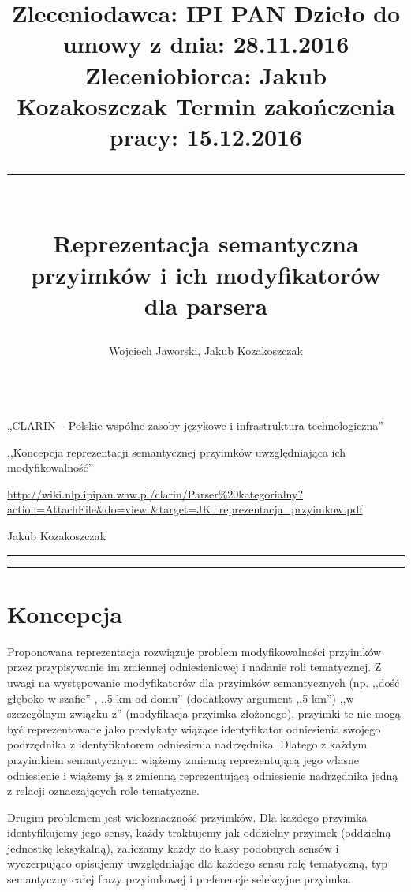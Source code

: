 \documentclass[a4paper, 12pt]{article}
\title{
\normalsize
\setlength{\topsep}{0pt} 
\noindent
Zleceniodawca: IPI PAN \hfill Dzieło do umowy z dnia:  28.11.2016 \\
Zleceniobiorca: Jakub Kozakoszczak \hfill Termin zakończenia pracy: 15.12.2016 \\
\rule{\linewidth}{2pt} \\[6pt] 
\huge Reprezentacja semantyczna \\ przyimków i ich modyfikatorów \\ dla parsera \eniam  \\[-2pt]}
\author{\Large Wojciech Jaworski, Jakub Kozakoszczak\\[6pt]
\hspace{-5pt}\rule{\linewidth}{2pt}  }
\date{}
\theoremstyle{remark}
\begin{document}
\maketitle

\vspace{-26pt}
\begin{description}
	\setlength{\itemsep}{4pt} 
	\setlength{\parskip}{0pt} 
	\item[Zrealizowane w ramach projektu:] „CLARIN -- Polskie wspólne zasoby językowe i infrastruktura technologiczna”
	\item[Tytuł pracy zamówionej:] ,,Koncepcja reprezentacji semantycznej przyimków uwzględniająca ich modyfikowalność''
	\item[Adres dzieła:] \url{http://wiki.nlp.ipipan.waw.pl/clarin/Parser%
	&target=JK_reprezentacja_przyimkow.pdf}
	\item[Opracowanie dokumentu:] Jakub Kozakoszczak
\end{description}

\vspace{6pt}
\hrule
\vspace{-14pt}
\renewcommand\contentsname{\normalsize{}}
\tableofcontents
\vspace{20pt}
\hrule
\newpage

\section{Koncepcja} %

Proponowana reprezentacja rozwiązuje problem modyfikowalności przyimków przez przypisywanie im zmiennej odniesieniowej i nadanie roli tematycznej.
Z uwagi na występowanie modyfikatorów dla przyimków semantycznych (np. ,,dość głęboko w szafie'' , ,,5 km od domu'' (dodatkowy argument ,,5 km'') ,,w szczególnym związku z'' (modyfikacja przyimka złożonego), przyimki te nie mogą być reprezentowane jako predykaty wiążące identyfikator odniesienia swojego podrzędnika z identyfikatorem odniesienia nadrzędnika.
Dlatego z każdym przyimkiem semantycznym wiążemy zmienną reprezentującą jego własne odniesienie i wiążemy ją z zmienną reprezentującą odniesienie nadrzędnika jedną z relacji oznaczających role tematyczne.

Drugim problemem jest wieloznaczność przyimków. Dla każdego przyimka identyfikujemy jego sensy, każdy traktujemy jak oddzielny przyimek (oddzielną jednostkę leksykalną), zaliczamy każdy do klasy podobnych sensów i wyczerpująco opisujemy uwzględniając dla każdego sensu
rolę tematyczną, 
typ semantyczny całej frazy przyimkowej
i preferencje selekcyjne przyimka.
\end{document}
